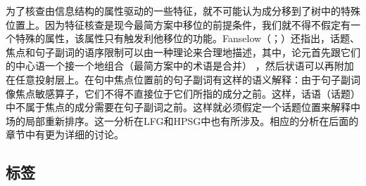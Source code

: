 为了核查由信息结构的属性驱动的一些特征，就不可能认为成分移到了树中的特殊位置上。因为特征核查是现今最简方案中移位的前提条件，我们就不得不假定有一个特殊的属性，该属性只有触发利他移位的功能。Fanselow（\citeyear[第4节]{Fanselow2003b}；\citeyear[]{Fanselow2006a}）还指出，话题、焦点和句子副词的语序限制可以由一种理论来合理地描述，其中，论元首先跟它们的中心语一个接一个地组合（最简方案中的术语是合并）
，然后状语可以再附加在任意投射层上。在句中焦点位置前的句子副词有这样的语义解释：由于句子副词像焦点敏感算子，它们不得不直接位于它们所指的成分之前。这样，话语（话题）中不属于焦点的成分需要在句子副词之前。这样就必须假定一个话题位置来解释中场的局部重新排序。这一分析在LFG\indexlfg 和HPSG\indexhpsg 中也有所涉及。相应的分析在后面的章节中有更为详细的讨论。
%

\subsection{标签}
\label{Abschnitt-Labeling}

